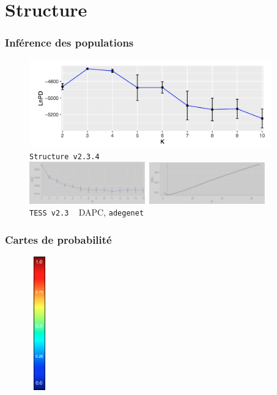 \documentclass[10pt,xcolor=table]{beamer}\usepackage[]{graphicx}\usepackage[]{color}
\begin{document}
\section{Structure}

\begin{frame}
	\frametitle{Inférence des populations}
	\begin{figure}
		\begin{center}
		\includegraphics[width=10.5cm]{lnpd1}\\
		\small\texttt{Structure~v2.3.4} \small\citep{pritchard2000}\\[0.5cm]
		\includegraphics[width=5cm]{dic}\hspace*{0.7cm}~\includegraphics[width=5cm]{bic}\\
		\small\texttt{TESS~v2.3} \small\citep{durand2009}\hspace*{1.2cm}~ DAPC, \small\texttt{adegenet} \small\citep{jombart2008}
		\end{center}
	\end{figure}
\end{frame}

\begin{frame}
	\frametitle{Cartes de probabilité}
	\begin{figure}
		\begin{center}
		\hspace*{8cm}~\includegraphics[width=0.5cm]{scale}
		\end{center}
	\end{figure}
\end{frame}
\end{document}
